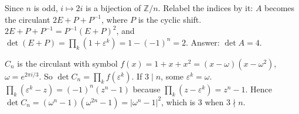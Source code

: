 \documentclass[11pt,a4paper]{article}
\begin{document}
Since \(n\) is odd, \(i\mapsto2i\) is a bijection of \(\mathbb Z/n\). Relabel the indices by it: \(A\) becomes the circulant \(2E+P+P^{-1}\), where \(P\) is the cyclic shift.
\(2E+P+P^{-1}=P^{-1}(E+P)^2\), and \(\det(E+P)=\prod_k(1+\varepsilon^k)=1-(-1)^n=2\). Answer: \(\det A=4\).

\(C_n\) is the circulant with symbol \(f(x)=1+x+x^2=(x-\omega)(x-\omega^2)\), \(\omega=e^{2\pi i/3}\). So \(\det C_n=\prod_{k}f(\varepsilon^k)\). If \(3\mid n\), some \(\varepsilon^k=\omega\).
\(\prod_k(\varepsilon^k-z)=(-1)^n(z^n-1)\) because \(\prod_k(z-\varepsilon^k)=z^n-1\). Hence \(\det C_n=(\omega^n-1)(\omega^{2n}-1)=|\omega^n-1|^2\), which is \(3\) when \(3\nmid n\).
\end{document}
